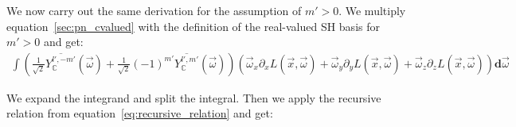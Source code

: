 We now carry out the same derivation for the assumption of $m'>0$. We multiply equation~\ref{sec:pn_cvalued} with the definition of the real-valued SH basis for $m'>0$ and get:
\begin{align*}
\int{\left(\frac{1}{\sqrt{2}}\overline{Y_{\mathbb{C}}^{l', -m'}}(\vec{\omega} )+\frac{1}{\sqrt{2}}\left({-1}\right)^{m'}\overline{Y_{\mathbb{C}}^{l', m'}}(\vec{\omega} )\right)\left(\vec{\omega}_{x}\partial_xL\left (\vec{x} ,\vec{\omega} \right )+\vec{\omega}_{y}\partial_yL\left (\vec{x} ,\vec{\omega} \right )+\vec{\omega}_{z}\partial_zL\left (\vec{x} ,\vec{\omega} \right )\right)\mathbf{d}\vec{\omega}}
\end{align*}


We expand the integrand and split the integral. Then we apply the recursive relation from equation~\ref{eq:recursive_relation} and get:
